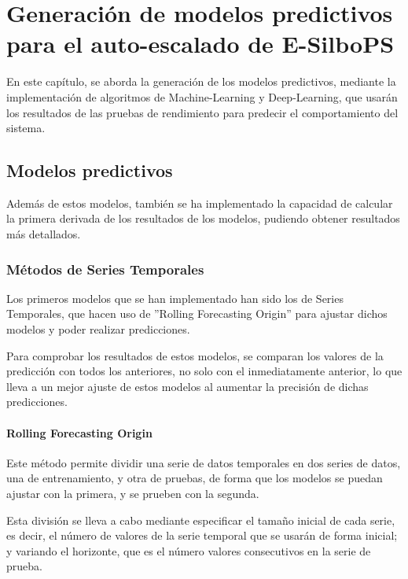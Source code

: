 \chapter{Generación de modelos predictivos para el auto-escalado de E-SilboPS} \label{chp:modelos}


En este capítulo, se aborda la generación de los modelos predictivos, mediante
la implementación de algoritmos de Machine-Learning y Deep-Learning, que 
usarán los resultados de las pruebas de rendimiento para predecir el 
comportamiento del sistema.


\section{Modelos predictivos} \label{sct:modelos_modelos-pred}

Además de estos modelos, también se ha implementado la capacidad de calcular
la primera derivada de los resultados de los modelos, pudiendo obtener resultados
más detallados.

\subsection{Métodos de Series Temporales}

Los primeros modelos que se han implementado han sido los de Series Temporales,
que hacen uso de ''Rolling Forecasting Origin''\cite{web:caret} para ajustar dichos
modelos y poder realizar predicciones.

Para comprobar los resultados de estos modelos, se comparan los valores de la
predicción con todos los anteriores, no solo con el inmediatamente anterior, lo
que lleva a un mejor ajuste de estos modelos al aumentar la precisión de dichas 
predicciones.

\subsubsection*{Rolling Forecasting Origin}

Este método permite dividir una serie de datos temporales en dos series de datos,
una de entrenamiento, y otra de pruebas, de forma que los modelos se puedan ajustar 
con la primera, y se prueben con la segunda.

Esta división se lleva a cabo mediante especificar el tamaño inicial de cada serie,
es decir, el número de valores de la serie temporal que se usarán de forma inicial;
y variando el horizonte, que es el número valores consecutivos en la serie de prueba.

